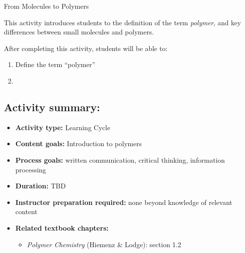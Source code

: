 %
%
%
%

\renewcommand{\figpath}{content/intro/molecules-to-polymers/figs}
\renewcommand{\labelbase}{molecules-to-polymers}

\begin{activity}{From Molecules to Polymers}

\begin{instructornotes}

	This activity introduces students to the definition of the term \emph{polymer}, and key differences between small molecules and polymers.
	
	After completing this activity, students will be able to:
			\begin{enumerate}
				\item Define the term ``polymer''
				\item 
			\end{enumerate}
			
	\subsection*{Activity summary:}
	\begin{itemize}
		\item \textbf{Activity type:} Learning Cycle
		\item \textbf{Content goals:} Introduction to polymers
		\item \textbf{Process goals:} %
			written communication, critical thinking, information processing
		\item \textbf{Duration:} TBD
		\item \textbf{Instructor preparation required:} none beyond knowledge of relevant content
		\item \textbf{Related textbook chapters:}
			\begin{itemize}
				\item \emph{Polymer Chemistry} (Hiemenz \& Lodge): section 1.2
			\end{itemize}
	\end{itemize}


\end{instructornotes}
\end{activity}
